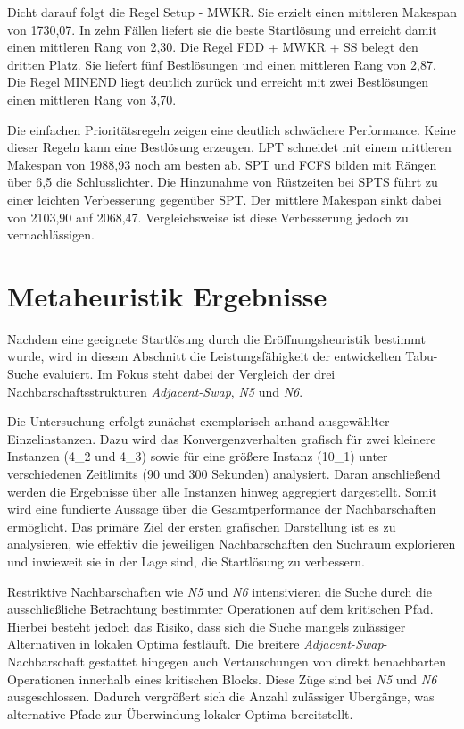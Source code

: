 Dicht darauf folgt die Regel Setup - MWKR.
Sie erzielt einen mittleren Makespan von 1730,07.
In zehn Fällen liefert sie die beste Startlösung und erreicht damit einen mittleren Rang von 2,30.
Die Regel FDD + MWKR + SS belegt den dritten Platz.
Sie liefert fünf Bestlösungen und einen mittleren Rang von 2,87.
Die Regel MINEND liegt deutlich zurück und erreicht mit zwei Bestlösungen einen mittleren Rang von 3,70.

Die einfachen Prioritätsregeln zeigen eine deutlich schwächere Performance.
Keine dieser Regeln kann eine Bestlösung erzeugen.
LPT schneidet mit einem mittleren Makespan von 1988,93 noch am besten ab.
SPT und FCFS bilden mit Rängen über 6,5 die Schlusslichter.
Die Hinzunahme von Rüstzeiten bei SPTS führt zu einer leichten Verbesserung gegenüber SPT.
Der mittlere Makespan sinkt dabei von 2103,90 auf 2068,47.
Vergleichsweise ist diese Verbesserung jedoch zu vernachlässigen.


\section{Metaheuristik Ergebnisse}
\label{sec:ergebnisse_metaheuristik}

Nachdem eine geeignete Startlösung durch die Eröffnungsheuristik bestimmt wurde, wird in diesem Abschnitt die Leistungsfähigkeit der entwickelten Tabu-Suche evaluiert.
Im Fokus steht dabei der Vergleich der drei Nachbarschaftsstrukturen \emph{Adjacent-Swap}, \emph{N5} und \emph{N6}.

Die Untersuchung erfolgt zunächst exemplarisch anhand ausgewählter Einzelinstanzen.
Dazu wird das Konvergenzverhalten grafisch für zwei kleinere Instanzen (4\_2 und 4\_3) sowie für eine größere Instanz (10\_1) unter verschiedenen Zeitlimits (90 und 300 Sekunden) analysiert.
Daran anschließend werden die Ergebnisse über alle Instanzen hinweg aggregiert dargestellt.
Somit wird eine fundierte Aussage über die Gesamtperformance der Nachbarschaften ermöglicht.
Das primäre Ziel der ersten grafischen Darstellung ist es zu analysieren, wie effektiv die jeweiligen Nachbarschaften den Suchraum explorieren und inwieweit sie in der Lage sind, die Startlösung zu verbessern.

Restriktive Nachbarschaften wie \emph{N5} und \emph{N6} intensivieren die Suche durch die ausschließliche Betrachtung bestimmter Operationen auf dem kritischen Pfad.
Hierbei besteht jedoch das Risiko, dass sich die Suche mangels zulässiger Alternativen in lokalen Optima festläuft.
Die breitere \emph{Adjacent-Swap}-Nachbarschaft gestattet hingegen auch Vertauschungen von direkt benachbarten Operationen innerhalb eines kritischen Blocks.
Diese Züge sind bei \emph{N5} und \emph{N6} ausgeschlossen.
Dadurch vergrößert sich die Anzahl zulässiger Übergänge, was alternative Pfade zur Überwindung lokaler Optima bereitstellt.

